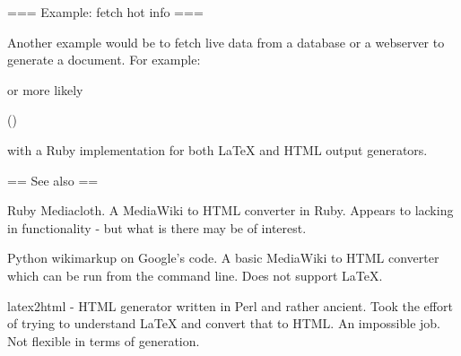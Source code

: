 === Example: fetch hot info ===

Another example would be to fetch live data from a database or a
webserver to generate a document. For example:


or more likely

  \userinfo(\username)

with a Ruby implementation for both LaTeX and HTML output generators.


== See also ==

Ruby Mediacloth. A MediaWiki to HTML converter in Ruby. Appears to
lacking in functionality - but what is there may be of interest.

Python wikimarkup on Google's code. A basic MediaWiki to HTML
converter which can be run from the command line. Does not support
LaTeX.

latex2html - HTML generator written in Perl and rather ancient. Took
the effort of trying to understand LaTeX and convert that to HTML. An
impossible job. Not flexible in terms of generation.
